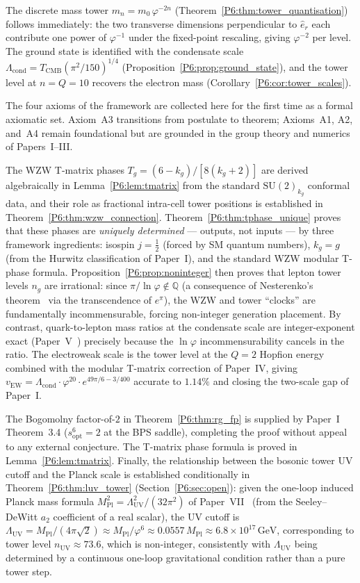 \documentclass[11pt,a4paper]{article}
\theoremstyle{definition}
\theoremstyle{remark}
\newcommand{\vp}{\varphi}
\newcommand{\sopt}{s_{\mathrm{opt}}}
\newcommand{\TCMB}{T_{\mathrm{CMB}}}
\newcommand{\vEW}{v_{\mathrm{EW}}}
\newcommand{\Lcond}{\Lambda_{\mathrm{cond}}}
\newcommand{\LUV}{\Lambda_{\mathrm{UV}}}
\newcommand{\MPl}{M_{\mathrm{Pl}}}
\begin{document}
The discrete mass tower $m_n = m_0\,\vp^{-2n}$
(Theorem~\ref{P6:thm:tower_quantisation}) follows immediately: the two
transverse dimensions perpendicular to $\hat{e}_r$ each contribute one
power of $\vp^{-1}$ under the fixed-point rescaling, giving $\vp^{-2}$
per level.  The ground state is identified with the condensate scale
$\Lcond = \TCMB(\pi^2/150)^{1/4}$
(Proposition~\ref{P6:prop:ground_state}), and the tower level at $n = Q = 10$
recovers the electron mass (Corollary~\ref{P6:cor:tower_scales}).

The four axioms of the framework are collected here for the first time
as a formal axiomatic set.  Axiom~A3 transitions from postulate to
theorem; Axioms~A1, A2, and~A4 remain foundational but are grounded
in the group theory and numerics of Papers~I--III.

The WZW T-matrix phases $T_g = (6-k_g)/[8(k_g+2)]$ are derived algebraically
in Lemma~\ref{P6:lem:tmatrix} from the standard $\mathrm{SU}(2)_{k_g}$ conformal
data, and their role as fractional intra-cell tower positions is established
in Theorem~\ref{P6:thm:wzw_connection}.
Theorem~\ref{P6:thm:tphase_unique} proves that these phases are \emph{uniquely
determined} --- outputs, not inputs --- by three framework ingredients:
isospin $j=\tfrac{1}{2}$ (forced by SM quantum numbers), $k_g=g$ (from the
Hurwitz classification of Paper~I), and the standard WZW modular T-phase
formula.
Proposition~\ref{P6:prop:noninteger} then proves that lepton tower levels
$n_g$ are irrational: since $\pi/\ln\vp\notin\mathbb{Q}$ (a consequence of
Nesterenko's theorem~\cite{Nesterenko1996} via the transcendence of $e^\pi$),
the WZW and tower ``clocks'' are fundamentally incommensurable, forcing
non-integer generation placement.
By contrast, quark-to-lepton mass ratios at the condensate scale are
integer-exponent exact (Paper~V~\cite{Paper5}) precisely because the
$\ln\vp$ incommensurability cancels in the ratio.
The electroweak scale is the tower level at the $Q=2$ Hopfion energy
combined with the modular T-matrix correction of Paper~IV,
giving $\vEW = \Lcond\cdot\vp^{20}\cdot e^{49\pi/6-3/400}$ accurate
to $1.14\%$ and closing the two-scale gap of Paper~I.

The Bogomolny factor-of-$2$ in Theorem~\ref{P6:thm:rg_fp}
is supplied by Paper~I~\cite{Paper1} Theorem~3.4 ($\sopt^6 = 2$ at the BPS saddle),
completing the proof without appeal to any external conjecture.
The T-matrix phase formula is proved in Lemma~\ref{P6:lem:tmatrix}.
Finally, the relationship between the bosonic tower UV cutoff and the
Planck scale is established conditionally in Theorem~\ref{P6:thm:luv_tower}
(Section~\ref{P6:sec:open}): given the one-loop induced Planck mass formula
$\MPl^2 = \LUV^2/(32\pi^2)$ of Paper~VII~\cite{Paper7} (from the
Seeley--DeWitt $a_2$ coefficient of a real scalar),
the UV cutoff is $\LUV = \MPl/(4\pi\sqrt{2}) \approx \MPl/\vp^6 \approx 0.0557\,\MPl
\approx 6.8\times10^{17}\,\mathrm{GeV}$,
corresponding to tower level $n_\mathrm{UV}\approx73.6$, which is
non-integer, consistently with $\LUV$ being determined by a continuous
one-loop gravitational condition rather than a pure tower step.
\end{document}
